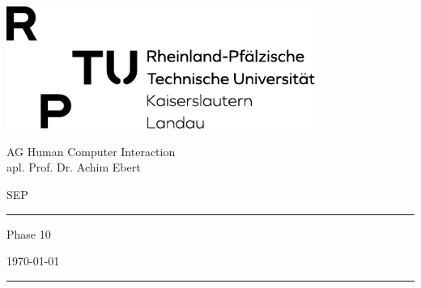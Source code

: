 \thispagestyle{empty}
	\newcommand{\Rule}{\rule{\textwidth}{0.5mm}}
	\begin{center}
	{\Large \includegraphics[height=40mm]{img/RPTU_LOGO_SCHWARZ} \par}

	\vspace{3em}

	{\Large AG Human Computer Interaction \\ apl. Prof. Dr. Achim Ebert \par}

	\vspace{0.5em}

	{\Large SEP \the\year \par}


	\vspace{2cm}

	\Rule

	\vspace{1cm}

	{\Huge Phase 10 \par}

	\vspace{0.5em}

	{\Large \mysubject \par}

	\vspace{0.5em}

	{\small \today \par}

	\vspace{0.7cm}

	\Rule


	\vfill %


	\emph{\textbf{\mygroup}} \\[1em]
	\myauthor

	\end{center}
